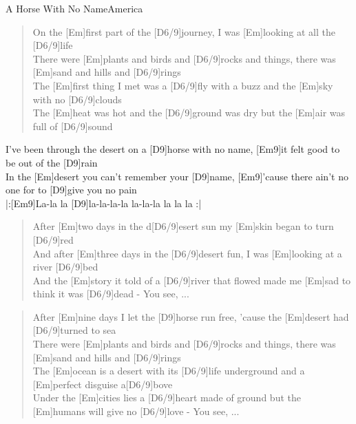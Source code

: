 \begin{song}{A Horse With No Name}{America}

    \begin{verse}  
        On the [Em]first part of the [D6/9]journey, I was [Em]looking at all the [D6/9]life \\
        There were [Em]plants and birds and [D6/9]rocks and things, there was [Em]sand and hills and [D6/9]rings \\
        The [Em]first thing I met was a [D6/9]fly with a buzz and the [Em]sky with no [D6/9]clouds \\
        The [Em]heat was hot and the [D6/9]ground was dry but the [Em]air was full of [D6/9]sound
    \end{verse}  

    \begin{chorus}
        [Em9]I've been through the desert on a [D9]horse with no name, [Em9]it felt good to be out of the [D9]rain \\
        In the [Em]desert you can't remember your [D9]name, [Em9]'cause there ain't no one for to [D9]give you no pain \\
        |:[Em9]La-la la [D9]la-la-la-la la-la-la la la la :|
    \end{chorus}

    \begin{verse}  
        After [Em]two days in the d[D6/9]esert sun my [Em]skin began to turn [D6/9]red \\
        And after [Em]three days in the [D6/9]desert fun, I was [Em]looking at a river [D6/9]bed \\
        And the [Em]story it told of a [D6/9]river that flowed made me [Em]sad to think it was [D6/9]dead - You see, ...
    \end{verse}  


    \begin{verse}  
        After [Em]nine days I let the [D9]horse run free, 'cause the [Em]desert had [D6/9]turned to sea \\
        There were [Em]plants and birds and [D6/9]rocks and things, there was [Em]sand and hills and [D6/9]rings \\
        The [Em]ocean is a desert with its [D6/9]life underground and a [Em]perfect disguise a[D6/9]bove \\
        Under the [Em]cities lies a [D6/9]heart made of ground but the [Em]humans will give no [D6/9]love - You see, ...
    \end{verse}  


\end{song}
